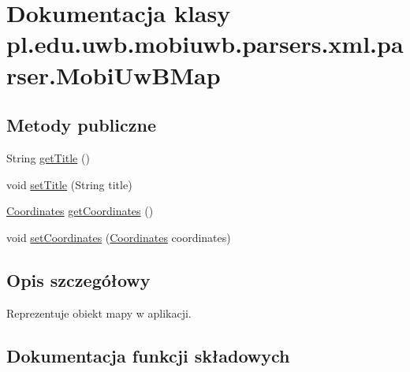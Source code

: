 \hypertarget{classpl_1_1edu_1_1uwb_1_1mobiuwb_1_1parsers_1_1xml_1_1parser_1_1_mobi_uw_b_map}{}\section{Dokumentacja klasy pl.\+edu.\+uwb.\+mobiuwb.\+parsers.\+xml.\+parser.\+Mobi\+Uw\+B\+Map}
\label{classpl_1_1edu_1_1uwb_1_1mobiuwb_1_1parsers_1_1xml_1_1parser_1_1_mobi_uw_b_map}
\subsection*{Metody publiczne}
\begin{DoxyCompactItemize}
\item 
String \hyperlink{classpl_1_1edu_1_1uwb_1_1mobiuwb_1_1parsers_1_1xml_1_1parser_1_1_mobi_uw_b_map_a4734c17237fc612e4e4972aaa7fcdbb2}{get\+Title} ()
\item 
void \hyperlink{classpl_1_1edu_1_1uwb_1_1mobiuwb_1_1parsers_1_1xml_1_1parser_1_1_mobi_uw_b_map_a722f4c48133afeb070234257a590671c}{set\+Title} (String title)
\item 
\hyperlink{classpl_1_1edu_1_1uwb_1_1mobiuwb_1_1parsers_1_1xml_1_1parser_1_1_coordinates}{Coordinates} \hyperlink{classpl_1_1edu_1_1uwb_1_1mobiuwb_1_1parsers_1_1xml_1_1parser_1_1_mobi_uw_b_map_a132767c368480824c96bb1083a6474d0}{get\+Coordinates} ()
\item 
void \hyperlink{classpl_1_1edu_1_1uwb_1_1mobiuwb_1_1parsers_1_1xml_1_1parser_1_1_mobi_uw_b_map_a9a8d1b6cdb017dd2c2261e79e4393bf4}{set\+Coordinates} (\hyperlink{classpl_1_1edu_1_1uwb_1_1mobiuwb_1_1parsers_1_1xml_1_1parser_1_1_coordinates}{Coordinates} coordinates)
\end{DoxyCompactItemize}


\subsection{Opis szczegółowy}
Reprezentuje obiekt mapy w aplikacji. 

\subsection{Dokumentacja funkcji składowych}
\hypertarget{classpl_1_1edu_1_1uwb_1_1mobiuwb_1_1parsers_1_1xml_1_1parser_1_1_mobi_uw_b_map_a132767c368480824c96bb1083a6474d0}{}
